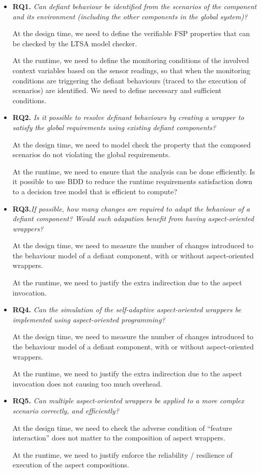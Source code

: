\begin{itemize}
\item {\bf RQ1.} {\em Can defiant behaviour be identified from the scenarios of the component and its environment (including the  other components in the global system)? }

At the design time, we need to define the verifiable FSP properties that can be checked by the LTSA model checker.

At the runtime, we need to define the  monitoring conditions of the involved context variables based on the sensor readings, so that when the monitoring conditions are
triggering the defiant behaviours (traced to the execution of scenarios) are identified. We need to define necessary and sufficient conditions. 

\item {\bf RQ2.} {\em Is it possible to resolve definant behaviours by creating a wrapper to satisfy the global requirements using existing defiant components?}

At the design time, we need to model check the property that the composed scenarios do not violating the global requirements.

At the runtime, we need to ensure that the analysis can be done efficiently. Is it possible to use BDD to reduce the runtime requirements satisfaction down to a decision tree model that is efficient to compute? 

\item {\bf RQ3.}{\em  If possible, how many changes are required to adapt the behaviour of a defiant component? Would such adapation benefit from having aspect-oriented wrappers?}

At the design time, we need to measure the number of changes introduced to the behaviour model of a defiant component, with or without aspect-oriented wrappers.

At the runtime, we need to justify the extra indirection due to the aspect invocation. 

\item {\bf RQ4.} {\em Can the simulation of the self-adaptive aspect-oriented wrappers be implemented using aspect-oriented programming?}

At the design time, we need to measure the number of changes introduced to the behaviour model of a defiant component, with or without aspect-oriented wrappers.

At the runtime, we need to justify the extra indirection due to the aspect invocation does not causing too much overhead.

\item {\bf RQ5.} {\em Can multiple aspect-oriented wrappers be applied to a more complex scenario correctly, and efficiently? }

At the design time, we need to check the adverse condition of ``feature interaction'' does not matter to the composition of aspect wrappers.

At the runtime, we need to justify enforce the reliability / resilience of execution of the aspect compositions. 
\end{itemize}

